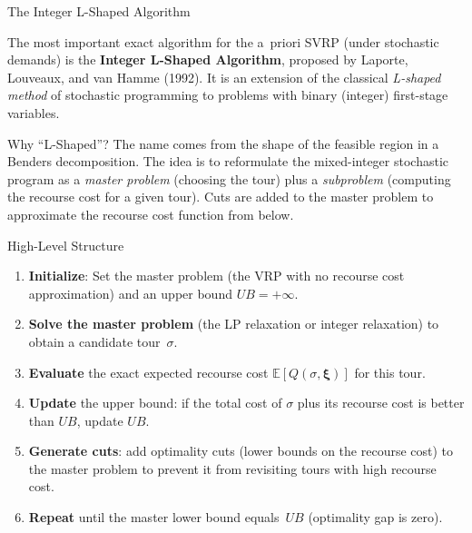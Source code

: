 \documentclass[aspectratio=169,10pt]{beamer}
\begin{document}
\begin{frame}[allowframebreaks]{The Integer L-Shaped Algorithm}

  The most important exact algorithm for the a~priori SVRP (under
  stochastic demands) is the \textbf{Integer L-Shaped Algorithm}, proposed
  by Laporte, Louveaux, and van Hamme (1992).
  It is an extension of the classical \emph{L-shaped method} of stochastic
  programming to problems with binary (integer) first-stage variables.

  \begin{block}{Why ``L-Shaped''?}
    The name comes from the shape of the feasible region in a Benders
    decomposition.  The idea is to reformulate the mixed-integer stochastic
    program as a \emph{master problem} (choosing the tour) plus a
    \emph{subproblem} (computing the recourse cost for a given tour).
    Cuts are added to the master problem to approximate the recourse cost
    function from below.
  \end{block}

  \begin{block}{High-Level Structure}
    \begin{enumerate}
      \item \textbf{Initialize}: Set the master problem (the VRP with no
            recourse cost approximation) and an upper bound $UB = +\infty$.
      \item \textbf{Solve the master problem} (the LP relaxation or integer
            relaxation) to obtain a candidate tour~$\sigma$.
      \item \textbf{Evaluate} the exact expected recourse cost
            $\mathbb{E}[Q(\sigma, \boldsymbol{\xi})]$ for this tour.
      \item \textbf{Update} the upper bound: if the total cost of $\sigma$
            plus its recourse cost is better than $UB$, update $UB$.
      \item \textbf{Generate cuts}: add optimality cuts (lower bounds on
            the recourse cost) to the master problem to prevent it from
            revisiting tours with high recourse cost.
      \item \textbf{Repeat} until the master lower bound equals~$UB$
            (optimality gap is zero).
    \end{enumerate}
  \end{block}

  \framebreak


\end{frame}
\end{document}
